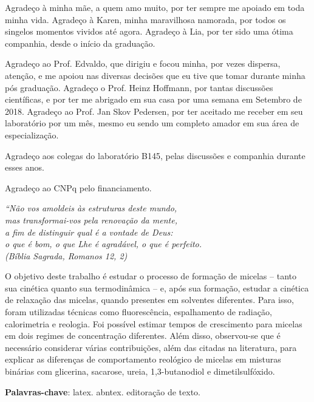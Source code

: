 \documentclass[
	12pt,				%
	openright,			%
	twoside,			%
	a4paper,			%
	english,			%
	brazil%
	]{abntex2}
\begin{document}
\begin{agradecimentos}

Agradeço à minha mãe, a quem amo muito, por ter sempre me apoiado em toda minha vida. Agradeço à Karen, minha maravilhosa namorada, por todos os singelos momentos vividos até agora. Agradeço à Lia, por ter sido uma ótima companhia, desde o início da graduação.

Agradeço ao Prof. Edvaldo, que dirigiu e focou minha, por vezes dispersa, atenção, e me apoiou nas diversas decisões que eu tive que tomar durante minha pós graduação. Agradeço o Prof. Heinz Hoffmann, por tantas discussões científicas, e por ter me abrigado em sua casa por uma semana em Setembro de 2018. Agradeço ao Prof. Jan Skov Pedersen, por ter aceitado me receber em seu laboratório por um mês, mesmo eu sendo um completo amador em sua área de especialização.

Agradeço aos colegas do laboratório B145, pelas discussões e companhia durante esses anos.

Agradeço ao CNPq pelo financiamento.

\end{agradecimentos}

\begin{epigrafe}
    \vspace*{\fill}
	\begin{flushright}
		\textit{``Não vos amoldeis às estruturas deste mundo, \\
		mas transformai-vos pela renovação da mente, \\
		a fim de distinguir qual é a vontade de Deus: \\
		o que é bom, o que Lhe é agradável, o que é perfeito.\\
		(Bíblia Sagrada, Romanos 12, 2)}
	\end{flushright}
\end{epigrafe}


\setlength{\absparsep}{18pt} %
\begin{resumo}
 O objetivo deste trabalho é estudar o processo de formação de micelas -- tanto sua cinética quanto sua termodinâmica -- e, após sua formação, estudar a cinética de relaxação das micelas, quando presentes em solventes diferentes. Para isso, foram utilizadas técnicas como fluorescência, espalhamento de radiação, calorimetria e reologia. Foi possível estimar tempos de crescimento para micelas em dois regimes de concentração diferentes. Além disso, observou-se que é necessário considerar várias contribuições, além das citadas na literatura, para explicar as diferenças de comportamento reológico de micelas em misturas binárias com glicerina, sacarose, ureia, 1,3-butanodiol e dimetilsulfóxido.

 \textbf{Palavras-chave}: latex. abntex. editoração de texto.
\end{resumo}
\end{document}
